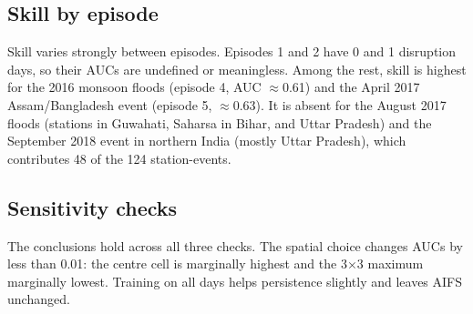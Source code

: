 \documentclass[11pt,a4paper]{article}
\begin{document}
\subsection{Skill by episode}
\begin{table}[H]\centering
\caption{ROC-AUC by flood episode (event-only training). ``--'': no disruption days, so AUC is undefined.}\label{tab:ep}
\resizebox{\textwidth}{!}{}
\end{table}
\noindent Skill varies strongly between episodes. Episodes 1 and 2 have 0 and 1 disruption days, so their
AUCs are undefined or meaningless. Among the rest, skill is highest for the 2016 monsoon floods (episode 4,
AUC $\approx$0.61) and the April 2017 Assam/Bangladesh event (episode 5, $\approx$0.63). It is absent for the August 2017 floods (stations in Guwahati, Saharsa in Bihar, and
Uttar Pradesh) and the September 2018 event in northern India (mostly Uttar Pradesh), which contributes 48
of the 124 station-events.

\subsection{Sensitivity checks}
\begin{table}[H]\centering\small
\caption{ROC-AUC under different spatial aggregations.}

\end{table}
\begin{table}[H]\centering\small
\caption{Event days only (GFD start to end, no $\pm$3-day padding), event-only training ($n=\nskilleventdays$).}

\end{table}
\begin{table}[H]\centering\small
\caption{Event windows, models trained on all other days instead of event windows only ($n=\nskilleventwindowsalltrain$).}

\end{table}
\noindent The conclusions hold across all three checks. The spatial choice changes AUCs by less than 0.01: the centre cell is marginally highest and the
3$\times$3 maximum marginally lowest. Training on all days helps persistence slightly and leaves AIFS unchanged.

\end{document}
